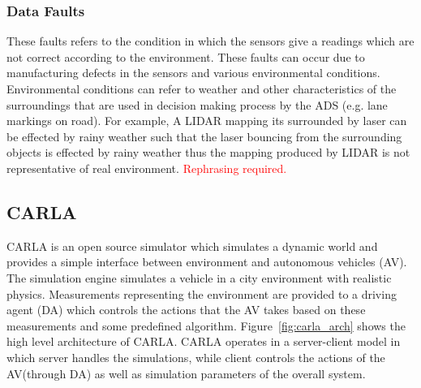  \subsubsection{Data Faults} These faults refers to the condition in which the sensors give a readings which are not correct according to the environment. These faults can occur due to manufacturing defects in the sensors and various environmental conditions. Environmental conditions can refer to weather and other characteristics of the surroundings that are used in decision making process by the ADS (e.g. lane markings on road). For example, A LIDAR mapping its surrounded by laser can be effected by rainy weather such that the laser bouncing from the surrounding objects is effected by rainy weather thus the mapping produced by LIDAR is not representative of real environment.
 \textcolor{red}{Rephrasing required.}
 
 \subsection{CARLA} \label{ri-carla}
 CARLA is an open source simulator which simulates a dynamic world and provides a simple interface between environment and autonomous vehicles (AV). The simulation engine simulates a vehicle in a city environment with realistic physics. Measurements representing the environment are provided to a driving agent (DA) which  controls the actions that the AV takes based on these measurements and some predefined algorithm. Figure~\ref{fig:carla_arch} shows the high level architecture of CARLA. CARLA operates in a server-client model in which server handles the simulations, while client controls the actions of the AV(through DA) as well as simulation parameters of the overall system. 
 
 

